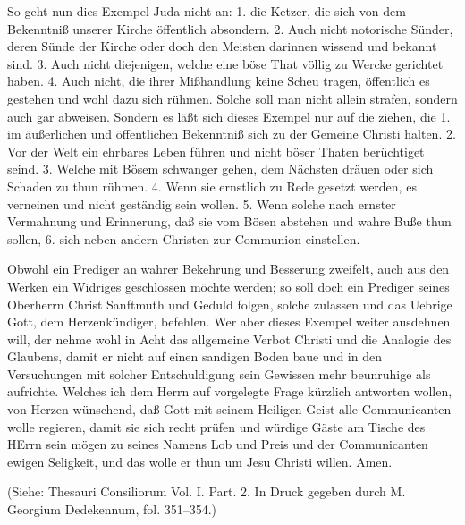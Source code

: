 So geht nun dies Exempel Juda nicht an: 1. die Ketzer, die sich von dem Bekenntniß unserer Kirche öffentlich absondern. 2. Auch nicht notorische Sünder, deren Sünde der Kirche oder doch den Meisten darinnen wissend und bekannt sind. 3. Auch nicht diejenigen, welche eine böse That völlig zu Wercke gerichtet haben. 4. Auch nicht, die ihrer Mißhandlung keine Scheu tragen, öffentlich es gestehen und wohl dazu sich rühmen. Solche soll man nicht allein strafen, sondern auch gar abweisen. Sondern es läßt sich dieses Exempel nur auf die ziehen, die 1. im äußerlichen und öffentlichen Bekenntniß sich zu der Gemeine Christi halten. 2. Vor der Welt ein ehrbares Leben führen und nicht böser Thaten berüchtiget seind. 3. Welche mit Bösem schwanger gehen, dem Nächsten dräuen oder sich Schaden zu thun rühmen. 4. Wenn sie ernstlich zu Rede gesetzt werden, es verneinen und nicht geständig sein wollen. 5. Wenn solche nach ernster Vermahnung und Erinnerung, daß sie vom Bösen abstehen und wahre Buße thun sollen, 6. sich neben andern Christen zur Communion einstellen.

Obwohl ein Prediger an wahrer Bekehrung und Besserung zweifelt, auch aus den Werken ein Widriges geschlossen möchte werden; so soll doch ein Prediger seines Oberherrn Christ Sanftmuth und Geduld folgen, solche zulassen und das Uebrige Gott, dem Herzenkündiger, befehlen. Wer aber dieses Exempel weiter ausdehnen will, der nehme wohl in Acht das allgemeine Verbot Christi und die Analogie des Glaubens, damit er nicht auf einen sandigen Boden baue und in den Versuchungen mit solcher Entschuldigung sein Gewissen mehr beunruhige als aufrichte. Welches ich dem Herrn auf vorgelegte Frage kürzlich antworten wollen, von Herzen wünschend, daß Gott mit seinem Heiligen Geist alle Communicanten wolle regieren, damit sie sich recht prüfen und würdige Gäste am Tische des HErrn sein mögen zu seines Namens Lob und Preis und der Communicanten ewigen Seligkeit, und das wolle er thun um Jesu Christi willen. Amen.

(Siehe: Thesauri Consiliorum Vol. I. Part. 2. In Druck gegeben durch M. Georgium Dedekennum, fol. 351–354.)
